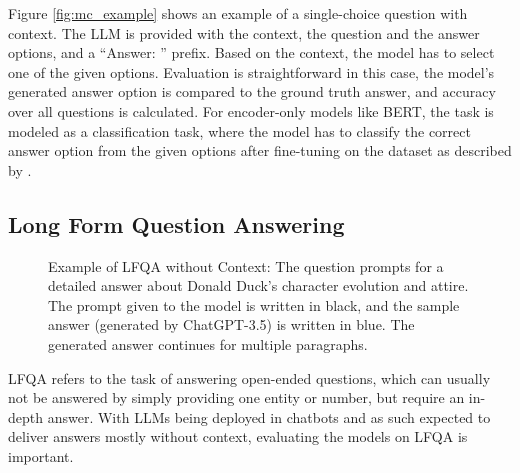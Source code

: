 Figure \ref{fig:mc_example} shows an example of a single-choice question with context.
The LLM is provided with the context, the question and the answer options, and a ``Answer: '' prefix.
Based on the context, the model has to select one of the given options.
Evaluation is straightforward in this case, the model's generated answer option is compared to the ground truth answer, and accuracy over all questions is calculated.
For encoder-only models like BERT, the task is modeled as a classification task, where the model has to classify the correct answer option from the given options after fine-tuning on the dataset as described by \cite{devlin:2018:BERT}.

\subsection{Long Form Question Answering}\label{sec:long-form-qa}
\begin{figure}[tb]
    \centering
    \caption{Example of LFQA without Context: The question prompts for a detailed answer about Donald Duck's character evolution and attire. The prompt given to the model is written in black, and the sample answer (generated by ChatGPT-3.5) is written in blue. The generated answer continues for multiple paragraphs.}
    \label{fig:long_form_qa_example_with_answer}
\end{figure}
LFQA refers to the task of answering open-ended questions, which can usually not be answered by simply providing one entity or number, but require an in-depth answer.
With LLMs being deployed in chatbots and as such expected to deliver answers mostly without context, evaluating the models on LFQA is important.

